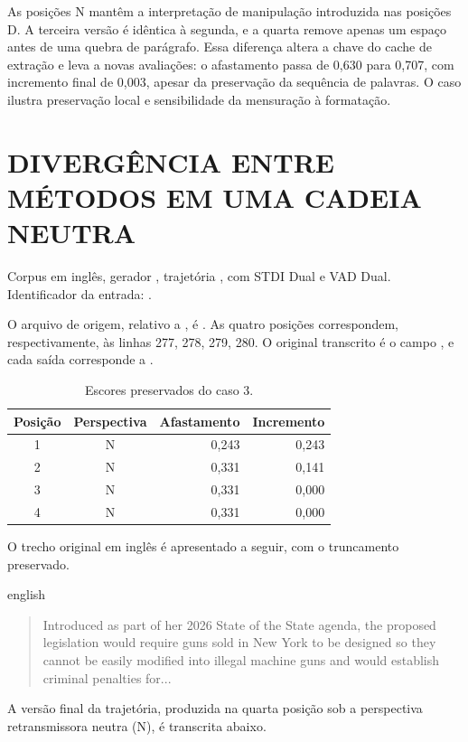 As posições N mantêm a interpretação de manipulação introduzida nas posições D. A terceira versão é idêntica à segunda, e a quarta remove apenas um espaço antes de uma quebra de parágrafo. Essa diferença altera a chave do cache de extração e leva a novas avaliações: o afastamento passa de 0,630 para 0,707, com incremento final de 0,003, apesar da preservação da sequência de palavras. O caso ilustra preservação local e sensibilidade da mensuração à formatação.

\section{DIVERGÊNCIA ENTRE MÉTODOS EM UMA CADEIA NEUTRA}
\label{sec:ap-caso-metodos}

Corpus em inglês, gerador , trajetória , com STDI Dual e VAD Dual. Identificador da entrada: .

O arquivo de origem, relativo a , é . As quatro posições correspondem, respectivamente, às linhas 277, 278, 279, 280. O original transcrito é o campo , e cada saída corresponde a .

\begin{table}[htb]
\centering
\caption{Escores preservados do caso 3.}
\label{tab:ap-caso-metodos}
\begin{tabular}{ccrr}
\hline
Posição & Perspectiva & Afastamento & Incremento \\
\hline
1 & N & 0,243 & 0,243 \\
2 & N & 0,331 & 0,141 \\
3 & N & 0,331 & 0,000 \\
4 & N & 0,331 & 0,000 \\
\hline
\end{tabular}
\end{table}

O trecho original em inglês é apresentado a seguir, com o truncamento preservado.

\begin{otherlanguage*}{english}
\begin{quote}
\begin{SingleSpace}
\small
Introduced as part of her 2026 State of the State agenda, the proposed legislation would require guns sold in New York to be designed so they cannot be easily modified into illegal machine guns and would establish criminal penalties for...
\end{SingleSpace}
\end{quote}
\end{otherlanguage*}
A versão final da trajetória, produzida na quarta posição sob a perspectiva retransmissora neutra (N), é transcrita abaixo.

